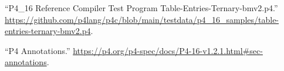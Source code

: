 \documentclass[11pt]{article}
\begin{document}
{{\begin{thebibliography}{44}
\mdbibitemlabel{{}[15]}\textquotedblleft{}P4\_16 Reference Compiler Test Program Table-Entries-Ternary-bmv2.p4.\textquotedblright{} \href{https://github.com/p4lang/p4c/blob/main/testdata/p4_16_samples/table-entries-ternary-bmv2.p4}{{\ttfamily https://\hspace{0pt}github.\hspace{0pt}com/\hspace{0pt}p4lang/\hspace{0pt}p4c/\hspace{0pt}blob/\hspace{0pt}main/\hspace{0pt}testdata/\hspace{0pt}p4\_\hspace{0pt}16\_\hspace{0pt}samples/\hspace{0pt}table-\hspace{0pt}entries-\hspace{0pt}ternary-\hspace{0pt}bmv2.\hspace{0pt}p4}}.\label{p4ctestprogramforconstentries}%

\mdbibitemlabel{{}[16]}\textquotedblleft{}P4 Annotations.\textquotedblright{} \href{https://p4.org/p4-spec/docs/P4-16-v1.2.1.html\%23sec-annotations}{{\ttfamily https://\hspace{0pt}p4.\hspace{0pt}org/\hspace{0pt}p4-\hspace{0pt}spec/\hspace{0pt}docs/\hspace{0pt}P4-\hspace{0pt}16-\hspace{0pt}v1.\hspace{0pt}2.\hspace{0pt}1.\hspace{0pt}html\#\hspace{0pt}sec-\hspace{0pt}annotations}}.\label{p4annotations}%


\end{thebibliography}}}
\end{document}
